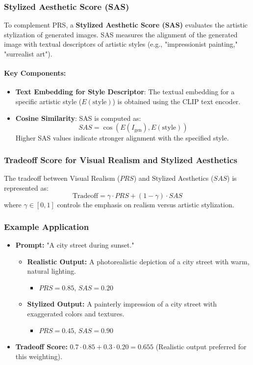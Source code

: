 \subsubsection{Stylized Aesthetic Score (SAS)}
To complement PRS, a \textbf{Stylized Aesthetic Score (SAS)} evaluates the artistic stylization of generated images. SAS measures the alignment of the generated image with textual descriptors of artistic styles (e.g., "impressionist painting," "surrealist art").

\paragraph{Key Components:}
\begin{itemize}
    \item \textbf{Text Embedding for Style Descriptor}:
    The textual embedding for a specific artistic style (\(E(\text{style})\)) is obtained using the CLIP text encoder.

    \item \textbf{Cosine Similarity}:
    SAS is computed as:
    \[
    SAS = \cos(E(I_{\text{gen}}), E(\text{style}))
    \]
    Higher SAS values indicate stronger alignment with the specified style.
\end{itemize}

\subsubsection{Tradeoff Score for Visual Realism and Stylized Aesthetics}
The tradeoff between Visual Realism (\(PRS\)) and Stylized Aesthetics (\(SAS\)) is represented as:
\[
\text{Tradeoff} = \gamma \cdot PRS + (1 - \gamma) \cdot SAS
\]
where \(\gamma \in [0,1]\) controls the emphasis on realism versus artistic stylization.

\subsubsection{Example Application}
\begin{itemize}
    \item \textbf{Prompt:} "A city street during sunset."
    \begin{itemize}
        \item \textbf{Realistic Output:} A photorealistic depiction of a city street with warm, natural lighting.
        \begin{itemize}
            \item \(PRS = 0.85\), \(SAS = 0.20\)
        \end{itemize}
        \item \textbf{Stylized Output:} A painterly impression of a city street with exaggerated colors and textures.
        \begin{itemize}
            \item \(PRS = 0.45\), \(SAS = 0.90\)
        \end{itemize}
    \end{itemize}
    \item \textbf{Tradeoff Score:} \(0.7 \cdot 0.85 + 0.3 \cdot 0.20 = 0.655\) (Realistic output preferred for this weighting).
\end{itemize}

